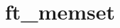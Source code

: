 \chapter{ft\+\_\+memset}
\hypertarget{md_Documentation_2ft__memset}{}\label{md_Documentation_2ft__memset}
